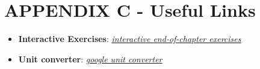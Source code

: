 \documentclass{article}
\begin{document}
\newpage

\section{APPENDIX C - Useful Links}
\begin{itemize}
	\item \textbf{Interactive Exercises}: \underline{\textit{\hyperlink{https://gaia.cs.umass.edu/kurose_ross/interactive/}{interactive end-of-chapter exercises}}}
	\item \textbf{Unit converter}: \underline{\textit{\hyperlink{https://www.google.com/search?q=unit+converter}{google unit converter}}}
\end{itemize}
\end{document}
